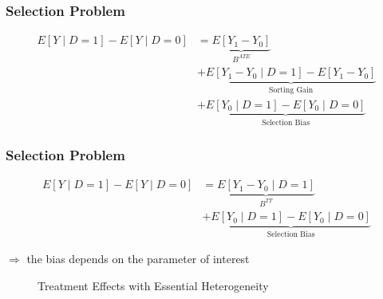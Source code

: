 \begin{frame}
\frametitle{Selection Problem}

\begin{align*}
E[Y\mid D = 1] - E[Y\mid D = 0] & = \underbrace{E[Y_1 - Y_0]}_{B^{ATE}} \\
	 							& + \underbrace{E[Y_1 - Y_0 \mid D = 1] - E[Y_1 - Y_0]}_{\text{Sorting Gain}} \\
								& + \underbrace{E[Y_0\mid D = 1] - E[Y_0 \mid D = 0]}_{\text{Selection Bias}}
\end{align*}

\end{frame}


\begin{frame}
\frametitle{Selection Problem}

\begin{align*}
E[Y\mid D = 1] - E[Y\mid D = 0] & = \underbrace{E[Y_1 - Y_0\mid D = 1]}_{B^{TT}} \\
& + \underbrace{E[Y_0\mid D= 1]- E[Y_0 \mid D = 0]}_{\text{Selection Bias}}
\end{align*}

\(\Rightarrow\) the bias depends on the parameter of interest

\end{frame}


\begin{frame}

\begin{figure}[htp]\centering
	\caption{Treatment Effects with Essential Heterogeneity}\label{Treatment Effects Conventional}
\end{figure}

\end{frame}


